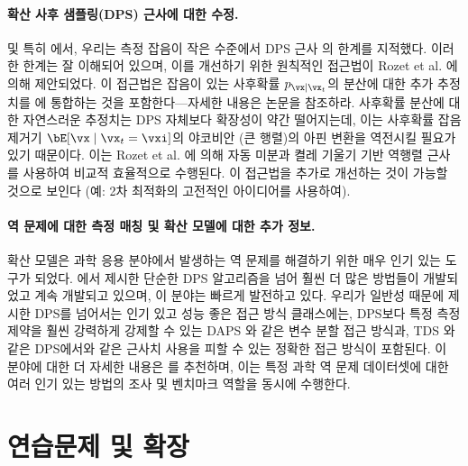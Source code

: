 \documentclass[../../book-main_ko.tex]{subfiles}
\begin{document}
\paragraph{확산 사후 샘플링(DPS) 근사에 대한 수정.}
 및 특히 에서, 우리는 측정 잡음이 작은 수준에서 DPS 근사 의 한계를 지적했다.
이러한 한계는 잘 이해되어 있으며, 이를 개선하기 위한 원칙적인 접근법이 Rozet et al. \cite{rozet2024learning}에 의해 제안되었다.
이 접근법은 잡음이 있는 사후확률 $p_{\vx \mid \vx_t}$의 분산에 대한 추가 추정치를 에 통합하는 것을 포함한다—자세한 내용은 논문을 참조하라.
사후확률 분산에 대한 자연스러운 추정치는 DPS 자체보다 확장성이 약간 떨어지는데, 이는 사후확률 잡음 제거기 $\bE[\vx \mid \vx_t=\vxi]$의 야코비안 (큰 행렬)의 아핀 변환을 역전시킬 필요가 있기 때문이다. 이는 Rozet et al. \cite{rozet2024learning}에 의해 자동 미분과 켤레 기울기 기반 역행렬 근사를 사용하여 비교적 효율적으로 수행된다. 이 접근법을 추가로 개선하는 것이 가능할 것으로 보인다 (예: 2차 최적화의 고전적인 아이디어를 사용하여).

\paragraph{역 문제에 대한 측정 매칭 및 확산 모델에 대한 추가 정보.}

확산 모델은 과학 응용 분야에서 발생하는 역 문제를 해결하기 위한 매우 인기 있는 도구가 되었다. 에서 제시한 단순한 DPS 알고리즘을 넘어 훨씬 더 많은 방법들이 개발되었고 계속 개발되고 있으며, 이 분야는 빠르게 발전하고 있다.
우리가 일반성 때문에 제시한 DPS를 넘어서는 인기 있고 성능 좋은 접근 방식 클래스에는, DPS보다 특정 측정 제약을 훨씬 강력하게 강제할 수 있는 DAPS \cite{Zhang2024-ha}와 같은 변수 분할 접근 방식과, TDS \cite{wu2023practical}와 같은 DPS에서와 같은 근사치 사용을 피할 수 있는 정확한 접근 방식이 포함된다.
이 분야에 대한 더 자세한 내용은 \cite{zheng2025inversebench}를 추천하며, 이는 특정 과학 역 문제 데이터셋에 대한 여러 인기 있는 방법의 조사 및 벤치마크 역할을 동시에 수행한다.

\section{연습문제 및 확장}
\end{document}
